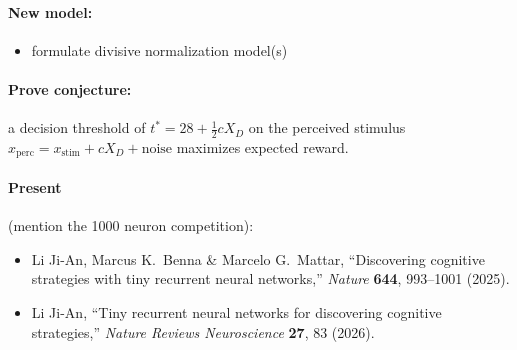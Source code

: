 \documentclass[11pt]{article}
\newcommand{\xs}{x_{\text{stim}}}
\newcommand{\xp}{x_{\text{perc}}}
\begin{document}
\paragraph{New model:}
\begin{itemize}[nosep]
  \item formulate divisive normalization model(s)
\end{itemize}

\paragraph{Prove conjecture:} a decision threshold of $t^* = 28 + \frac12 cX_D$ on the
perceived stimulus $\xp = \xs + cX_D + \text{noise}$ maximizes expected reward.

\paragraph{Present} (mention the 1000 neuron competition):
\begin{itemize}
  \item Li Ji-An, Marcus K.~Benna \& Marcelo G.~Mattar, ``Discovering cognitive strategies
  with tiny recurrent neural networks,'' \emph{Nature} \textbf{644}, 993--1001 (2025).
  \item Li Ji-An, ``Tiny recurrent neural networks for discovering cognitive strategies,''
  \emph{Nature Reviews Neuroscience} \textbf{27}, 83 (2026).
\end{itemize}
\end{document}
